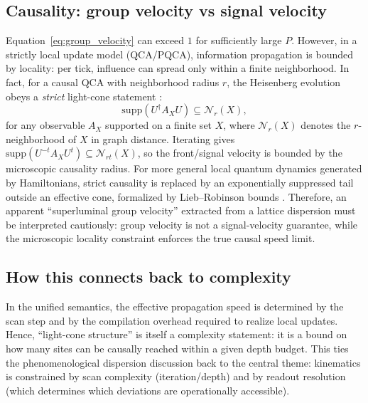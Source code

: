 \subsection{Causality: group velocity vs signal velocity}
Equation~\eqref{eq:group_velocity} can exceed $1$ for sufficiently large $P$.
However, in a strictly local update model (QCA/PQCA), information propagation is bounded by locality: per tick, influence can spread only within a finite neighborhood.
In fact, for a causal QCA with neighborhood radius $r$, the Heisenberg evolution obeys a \emph{strict} light-cone statement \cite{ArrighiNesmeWerner2011}:
\begin{equation}
\mathrm{supp}\!\left(U^{\dagger}A_XU\right)\subseteq \mathcal{N}_r(X),
\end{equation}
for any observable $A_X$ supported on a finite set $X$, where $\mathcal{N}_r(X)$ denotes the $r$-neighborhood of $X$ in graph distance.
Iterating gives $\mathrm{supp}(U^{-t}A_XU^t)\subseteq \mathcal{N}_{rt}(X)$, so the front/signal velocity is bounded by the microscopic causality radius.
For more general local quantum dynamics generated by Hamiltonians, strict causality is replaced by an exponentially suppressed tail outside an effective cone, formalized by Lieb--Robinson bounds \cite{LiebRobinson1972}.
Therefore, an apparent ``superluminal group velocity'' extracted from a lattice dispersion must be interpreted cautiously: group velocity is not a signal-velocity guarantee, while the microscopic locality constraint enforces the true causal speed limit.

\subsection{How this connects back to complexity}
In the unified semantics, the effective propagation speed is determined by the scan step and by the compilation overhead required to realize local updates.
Hence, ``light-cone structure'' is itself a complexity statement: it is a bound on how many sites can be causally reached within a given depth budget.
This ties the phenomenological dispersion discussion back to the central theme: kinematics is constrained by scan complexity (iteration/depth) and by readout resolution (which determines which deviations are operationally accessible).


